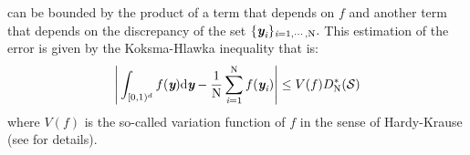  can be bounded by the product of a term that depends on $f$ and another term that depends on the discrepancy of the set $\{\textit{\textbf{y}}_{\textit{i}}\}_{\textit{i}=1, \cdots, \textrm{N}}.$ This estimation of the error is given by the Koksma-Hlawka inequality that is:
\begin{equation}
\Bigg|\int_{[0,1)^d}f(\textit{\textbf{y}}) \textrm{d}\textit{\textbf{y}}-\frac{1}{\textrm{N}}\sum_{\textit{i}=1}^{\textrm{N}}f(\textit{\textbf{y}}_{\textit{i}})\Bigg|\leq V(f)D^*_{\textrm{N}}({\mathcal{S}})
\end{equation}
where $V(f)$ is the so-called variation function of $f$ in the sense of Hardy-Krause (see \cite{brandolini2013koksma,owen2005multidimensional} for details).

